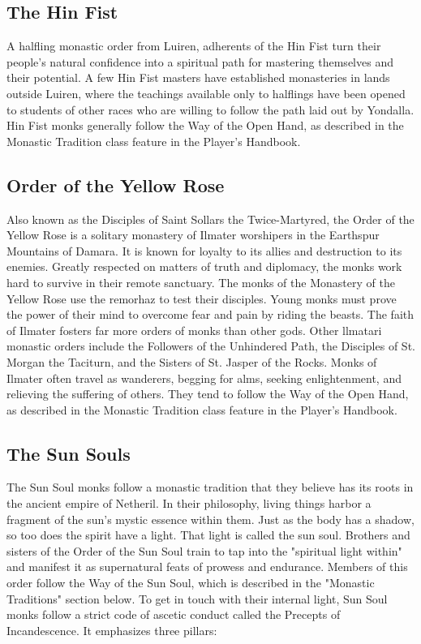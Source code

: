 \documentclass[10pt,a4paper,twoside,twocolumn,openany,bg=print,nodeprecatedcode]{dndbook}
\begin{document}
\subsection{The Hin Fist}
A halfling monastic order from Luiren, adherents of the Hin Fist turn their people's natural confidence into a spiritual path for mastering themselves and their potential. A few Hin Fist masters have established monasteries in lands outside Luiren, where the teachings available only to halflings have been opened to students of other races who are willing to follow the path laid out by Yondalla. Hin Fist monks generally follow the Way of the Open Hand, as described in the Monastic Tradition class feature in the Player's Handbook.
\subsection{Order of the Yellow Rose}
Also known as the Disciples of Saint Sollars the Twice-Martyred, the Order of the Yellow Rose is a solitary monastery of Ilmater worshipers in the Earthspur Mountains of Damara. It is known for loyalty to its allies and destruction to its enemies. Greatly respected on matters of truth and diplomacy, the monks work hard to survive in their remote sanctuary. The monks of the Monastery of the Yellow Rose use the remorhaz to test their disciples. Young monks must prove the power of their mind to overcome fear and pain by riding the beasts.
The faith of Ilmater fosters far more orders of monks than other gods. Other llmatari monastic orders include the Followers of the Unhindered Path, the Disciples of St. Morgan the Taciturn, and the Sisters of St. Jasper of the Rocks.
Monks of Ilmater often travel as wanderers, begging for alms, seeking enlightenment, and relieving the suffering of others. They tend to follow the Way of the Open Hand, as described in the Monastic Tradition class feature in the Player's Handbook.
\subsection{The Sun Souls}
The Sun Soul monks follow a monastic tradition that they believe has its roots in the ancient empire of Netheril. In their philosophy, living things harbor a fragment of the sun's mystic essence within them. Just as the body has a shadow, so too does the spirit have a light. That light is called the sun soul. Brothers and sisters of the Order of the Sun Soul train to tap into the "spiritual light within" and manifest it as supernatural feats of prowess and endurance. Members of this order follow the Way of the Sun Soul, which is described in the "Monastic Traditions" section below.
To get in touch with their internal light, Sun Soul monks follow a strict code of ascetic conduct called the Precepts of Incandescence. It emphasizes three pillars:
\end{document}
